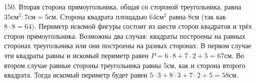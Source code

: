 150. Вторая сторона прямоугольника, общая со стороной треугольника, равна $35\text{см}^2:7\text{см}=5$см. Сторона квадрата площадью $64\text{см}^2$ равна 8см (так как $8\cdot8=64).$ Периметр искомой фигуры состоит из шести сторон квадратов и трёх сторон прямоугольника. Возможны два случая: квадраты построены на равных сторонах треугольника или они построены на разных сторонах. В первом случае эти квадраты равны и искомый периметр равен $P=6\cdot8+7\cdot2+5=67$см. Во втором случае равные стороны треугольника равны 5см, как и сторона второго квадрата. Тогда искомый периметр будет равен $5\cdot3+8\cdot3+7\cdot2+5=58$см.\\
